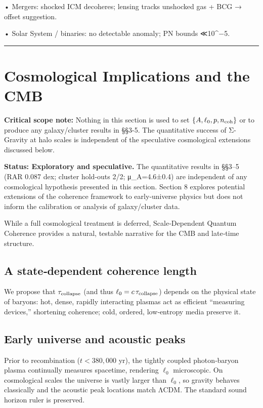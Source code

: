 \documentclass[11pt,a4paper]{article}
\begin{document}
• Mergers: shocked ICM decoheres; lensing tracks unshocked gas + BCG → offset suggestion.  

• Solar System / binaries: no detectable anomaly; PN bounds ≪10^−5.


\medskip\hrule\medskip


\section{Cosmological Implications and the CMB}


\textbf{Critical scope note:} Nothing in this section is used to set $\{A, \ell_0, p, n_{\rm coh}\}$ or to produce any galaxy/cluster results in §§3-5. The quantitative success of Σ-Gravity at halo scales is independent of the speculative cosmological extensions discussed below.


\textbf{Status: Exploratory and speculative.} The quantitative results in §§3–5 (RAR 0.087 dex; cluster hold-outs 2/2; μ\_A=4.6±0.4) are independent of any cosmological hypothesis presented in this section. Section 8 explores potential extensions of the coherence framework to early‑universe physics but does not inform the calibration or analysis of galaxy/cluster data.


While a full cosmological treatment is deferred, Scale‑Dependent Quantum Coherence provides a natural, testable narrative for the CMB and late‑time structure.


\subsection{A state‑dependent coherence length}


We propose that $\tau_{\rm collapse}$ (and thus $\ell_0=c\,\tau_{\rm collapse}$) depends on the physical state of baryons: hot, dense, rapidly interacting plasmas act as efficient “measuring devices,” shortening coherence; cold, ordered, low‑entropy media preserve it.


\subsection{Early universe and acoustic peaks}


Prior to recombination ($t<380{,}000$ yr), the tightly coupled photon‑baryon plasma continually measures spacetime, rendering $\ell_0$ microscopic. On cosmological scales the universe is vastly larger than $\ell_0$, so gravity behaves classically and the acoustic peak locations match ΛCDM. The standard sound horizon ruler is preserved.
\end{document}
